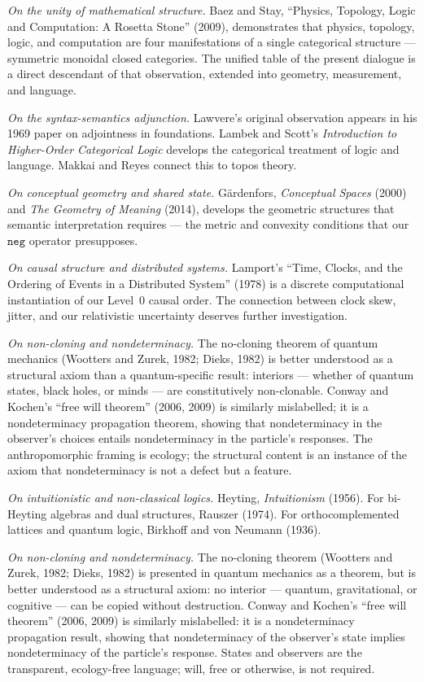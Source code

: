\documentclass[11pt]{article}
\begin{document}
\textit{On the unity of mathematical structure.} Baez and Stay,
``Physics, Topology, Logic and Computation: A Rosetta Stone'' (2009),
demonstrates that physics, topology, logic, and computation are four
manifestations of a single categorical structure --- symmetric
monoidal closed categories. The unified table of the present dialogue
is a direct descendant of that observation, extended into geometry,
measurement, and language.

\textit{On the syntax-semantics adjunction.} Lawvere's original
observation appears in his 1969 paper on adjointness in foundations.
Lambek and Scott's \textit{Introduction to Higher-Order Categorical
Logic} develops the categorical treatment of logic and language.
Makkai and Reyes connect this to topos theory.

\textit{On conceptual geometry and shared state.} G\"ardenfors,
\textit{Conceptual Spaces} (2000) and \textit{The Geometry of
Meaning} (2014), develops the geometric structures that semantic
interpretation requires --- the metric and convexity conditions
that our $\texttt{neg}$ operator presupposes.

\textit{On causal structure and distributed systems.} Lamport's
``Time, Clocks, and the Ordering of Events in a Distributed System''
(1978) is a discrete computational instantiation of our Level~0
causal order. The connection between clock skew, jitter, and our
relativistic uncertainty deserves further investigation.

\textit{On non-cloning and nondeterminacy.} The no-cloning theorem
of quantum mechanics (Wootters and Zurek, 1982; Dieks, 1982) is
better understood as a structural axiom than a quantum-specific
result: interiors --- whether of quantum states, black holes, or
minds --- are constitutively non-clonable. Conway and Kochen's
``free will theorem'' (2006, 2009) is similarly mislabelled; it is
a nondeterminacy propagation theorem, showing that nondeterminacy
in the observer's choices entails nondeterminacy in the particle's
responses. The anthropomorphic framing is ecology; the structural
content is an instance of the axiom that nondeterminacy is not a
defect but a feature.

\textit{On intuitionistic and non-classical logics.} Heyting,
\textit{Intuitionism} (1956). For bi-Heyting algebras and dual
structures, Rauszer (1974). For orthocomplemented lattices and
quantum logic, Birkhoff and von Neumann (1936).

\textit{On non-cloning and nondeterminacy.} The no-cloning theorem
(Wootters and Zurek, 1982; Dieks, 1982) is presented in quantum
mechanics as a theorem, but is better understood as a structural
axiom: no interior --- quantum, gravitational, or cognitive --- can
be copied without destruction. Conway and Kochen's ``free will
theorem'' (2006, 2009) is similarly mislabelled: it is a
nondeterminacy propagation result, showing that nondeterminacy of
the observer's state implies nondeterminacy of the particle's
response. States and observers are the transparent, ecology-free
language; will, free or otherwise, is not required.
\end{document}
